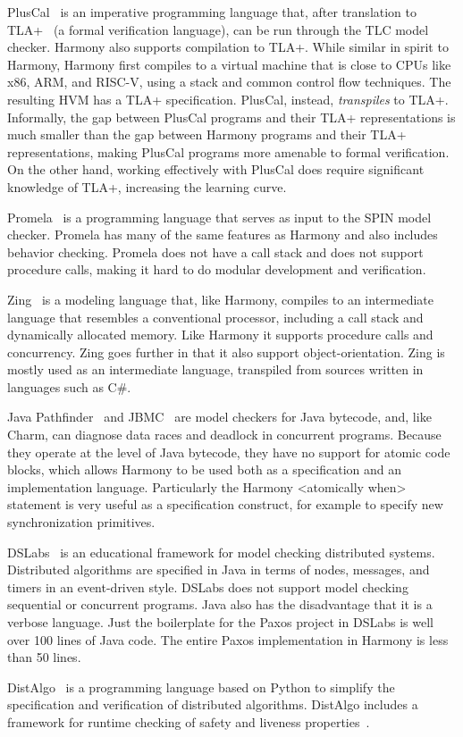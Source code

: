 \documentclass[twocolumn]{article}
\begin{document}
PlusCal~\cite{Lamport09} is an imperative programming language that,
after translation to TLA+~\cite{Lamport02} (a formal verification
language), can be run through the TLC model checker.  Harmony also
supports compilation to TLA+.  While similar in spirit to Harmony,
Harmony first compiles to a virtual machine that is close to CPUs
like x86, ARM, and RISC-V, using a stack and common control flow
techniques.  The resulting HVM has a TLA+ specification.  PlusCal,
instead, \emph{trans\-piles} to TLA+.  Informally, the gap between
PlusCal programs and their TLA+ representations is much smaller
than the gap between Harmony programs and their TLA+ representations,
making PlusCal programs more amenable to formal verification.  On the other
hand, working effectively with PlusCal does require significant
knowledge of TLA+, increasing the learning curve.

Promela~\cite{SPIN} is a programming language that serves as input
to the SPIN model checker.  Promela has many of the same features
as Harmony and also includes behavior checking.  Promela
does not have a call stack and does not support procedure calls,
making it hard to do modular development and verification.

Zing~\cite{Zing} is a modeling language that, like Harmony, compiles to an
intermediate language that resembles a conventional processor,
including a call stack and dynamically allocated memory.  Like
Harmony it supports procedure calls and concurrency.  Zing goes
further in that it also support object-orientation.  Zing is
mostly used as an intermediate language, transpiled from sources
written in languages such as C\#.

Java Pathfinder~\cite{Pathfinder} and JBMC~\cite{JBMC} are model
checkers for Java bytecode, and,
like Charm, can diagnose data races and deadlock in concurrent
programs.  Because they operate at the level of Java bytecode, they
have no support for atomic code blocks, which allows Harmony to be
used both as a specification and an implementation language.
Particularly the Harmony <{atomically when}> statement is very
useful as a specification construct, for example to specify new
synchronization primitives.

DSLabs~\cite{MWA19} is an educational framework for model checking distributed
systems.  Distributed algorithms are specified in Java in terms of
nodes, messages, and timers in an event-driven style.  DSLabs does not
support model checking sequential or concurrent programs.  Java
also has the disadvantage that it is a verbose language.  Just the
boilerplate for the Paxos project in DSLabs is well over 100 lines
of Java code.  The entire Paxos implementation in Harmony is less
than 50 lines.

Dist\-Algo~\cite{DistAlgo} is a programming language based on Python to
simplify the specification and verification of distributed algorithms.
Dist\-Algo includes a framework for runtime checking of safety and liveness
properties~\cite{LS20}.



\end{document}
